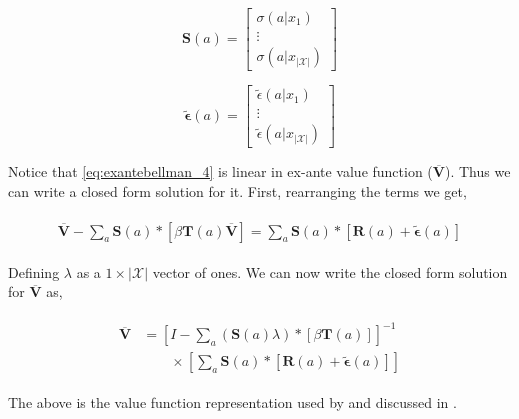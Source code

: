 \documentclass{article}
\begin{document}
\[
\mathbf{S}(a)=\left[\begin{array}{c}\sigma(a|x_1)\\ \vdots\\ \sigma(a|x_{|\mathcal{X}|})\end{array} \right]
\]

\[
\tilde{\bm{\epsilon}}(a)=\left[\begin{array}{c}\tilde{\epsilon}(a|x_1)\\ \vdots \\ \tilde{\epsilon}(a|x_{|\mathcal{X}|})\end{array}\right]
\]



Notice that \eqref{eq:exantebellman_4} is linear in ex-ante value function ($\overline{\mathbf{V}}$). Thus we can write a closed form solution for it.
First, rearranging the terms we get,

\begin{align}
    \begin{split}
    \overline{\mathbf{V}}-\sum_{a}\mathbf{S}(a) *\left[ \beta \mathbf{T}(a) \overline{\mathbf{V}}\right]=\sum_{a}\mathbf{S}(a) *\left[ \mathbf{R}(a)+\tilde{\bm{\epsilon}}(a)\right]
    \end{split}
\end{align}

Defining $\lambda$ as a $1\times|\mathcal{X}|$ vector of ones.
We can now write the closed form solution for $\overline{\mathbf{V}}$ as,

\begin{align} \label{eq:exante_inversion}
\begin{split}
\overline{\mathbf{V}} &=\left[I-\sum_{a}(\mathbf{S}(a) \lambda) *\left[ \beta \mathbf{T}(a)  \right]\right]^{-1} \\
& \qquad \times \left[\sum_{a}\mathbf{S}(a) *\left[ \mathbf{R}(a)+\tilde{\bm{\epsilon}}(a)\right]\right]
\end{split}
\end{align}

The above is the value function representation used by \cite{pese} and discussed in \cite{arcidiacono}.

\end{document}
